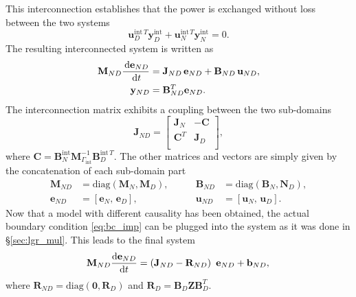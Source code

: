 \documentclass{ifacconf}
\newcommand{\secref}[1]{\S\ref{#1}}
\begin{document}
This interconnection establishes that the power is exchanged without loss between the two systems
\begin{equation}
\mathbf{u}_D^{\text{int}\, T} \mathbf{y}_D^{\text{int}} + \mathbf{u}_N^{\text{int}\, T} \mathbf{y}_N^{\text{int}} = 0.
\end{equation}
The resulting interconnected system is written as
\begin{equation}
\begin{aligned}
\mathbf{M}_{ND}\frac{\,\mathrm{d} \mathbf{e}_{ND}}{\,\mathrm{d} t} &= \mathbf{J}_{ND} \, \mathbf{e}_{ND} + \mathbf{B}_{ND} \, \mathbf{u}_{ND}, \\
\mathbf{y}_{ND}& = \mathbf{B}_{ND}^T \mathbf{e}_{ND}.
\end{aligned}
\end{equation}
The interconnection matrix exhibits a coupling between the two sub-domains
\[
\mathbf{J}_{ND} = 
\begin{bmatrix}
\mathbf{J}_N & -\mathbf{C} \\
\mathbf{C}^T & \mathbf{J}_D \\
\end{bmatrix},
\]
where $\mathbf{C} = \mathbf{B}_{N}^{\text{int}} \mathbf{M}_{\Gamma_{\text{int}}}^{-1} \mathbf{B}_{D}^{\text{int}\, T}$. The other matrices and vectors are simply given by the concatenation of each sub-domain part
\begin{equation*}
\begin{aligned}
\mathbf{M}_{ND} &= \text{diag}(\mathbf{M}_N, \mathbf{M}_D), \\
\mathbf{e}_{ND} &= [\mathbf{e}_N, \, \mathbf{e}_D], 
\end{aligned} \qquad 
\begin{aligned}
\mathbf{B}_{ND} &= \text{diag}(\mathbf{B}_N, \mathbf{N}_D), \\
\mathbf{u}_{ND} &= [\mathbf{u}_N, \, \mathbf{u}_D].
\end{aligned}
\end{equation*}
Now that a model with different causality has been obtained, the actual boundary condition \eqref{eq:bc_imp} can be plugged into the system as it was done in \secref{sec:lgr_mul}. This leads to the final system
\begin{equation}
\label{eq:sys_ode}
\mathbf{M}_{ND} \diff{\mathbf{e}_{ND}}{t} = \left(\mathbf{J}_{ND} - \mathbf{R}_{ND} \right) \ \mathbf{e}_{ND} + \mathbf{b}_{ND}, \\
\end{equation}
where $\mathbf{R}_{ND} = \text{diag}(\mathbf{0}, \mathbf{R}_D)$ and $\mathbf{R}_D = \mathbf{B}_D \mathbf{Z} \mathbf{B}_D^T$.
\end{document}
